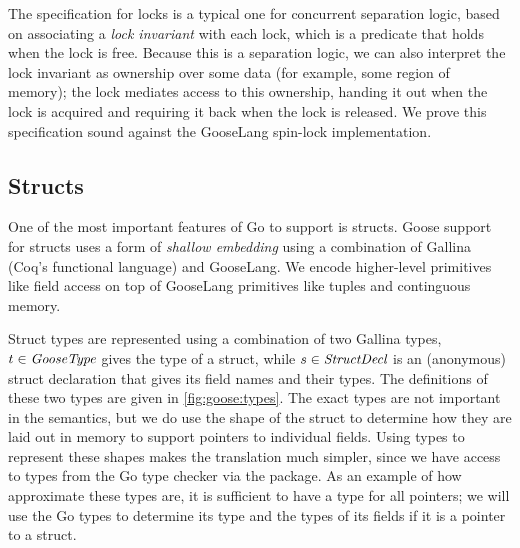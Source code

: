 The specification for locks is a typical one for concurrent separation logic,
based on associating a \emph{lock invariant} with each lock, which is a predicate that holds when the lock
is free. Because this is a separation logic, we can also interpret the lock
invariant as ownership over some data (for example, some region of memory); the
lock mediates access to this ownership, handing it out when the lock is acquired
and requiring it back when the lock is released. We prove this specification
sound against the GooseLang spin-lock implementation.

\subsection{Structs}


One of the most important features of Go to support is structs. Goose support
for structs uses a form of \emph{shallow embedding} using a combination of
Gallina (Coq's functional language) and GooseLang. We encode
higher-level primitives like field access on top of GooseLang primitives like
tuples and continguous memory.

Struct types are represented using a combination of two Gallina types,
$t \in \textit{GooseType}$ gives the type of a struct, while
$s \in \textit{StructDecl}$ is an (anonymous) struct declaration that gives its
field names and their types. The definitions of these two types are given in
\cref{fig:goose:types}. The exact types are not important in the semantics,
but we do use the shape of the struct to determine how they are laid out in
memory to support pointers to individual fields. Using types to represent these
shapes makes the translation much simpler, since we have access to types from
the Go type checker via the  package. As an example of how
approximate these types are, it is sufficient to have a  type for
all pointers; we will use the Go types to determine its type and the types of
its fields if it is a pointer to a struct.

